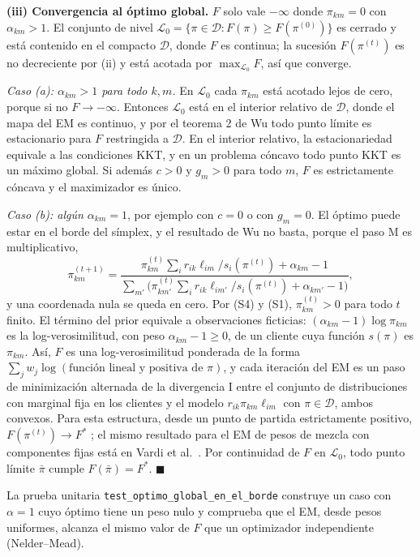 \documentclass[11pt,a4paper]{article}
\begin{document}
\textbf{(iii) Convergencia al óptimo global.} $F$ solo vale $-\infty$ donde $\pi_{km}=0$ con $\alpha_{km}>1$. El conjunto de nivel $\mathcal L_0=\{\pi\in\mathcal D:F(\pi)\ge F(\pi^{(0)})\}$ es cerrado y está contenido en el compacto $\mathcal D$, donde $F$ es continua; la sucesión $F(\pi^{(t)})$ es no decreciente por (ii) y está acotada por $\max_{\mathcal L_0}F$, así que converge.

\emph{Caso (a): $\alpha_{km}>1$ para todo $k,m$.} En $\mathcal L_0$ cada $\pi_{km}$ está acotado lejos de cero, porque si no $F\to-\infty$. Entonces $\mathcal L_0$ está en el interior relativo de $\mathcal D$, donde el mapa del EM es continuo, y por el teorema 2 de Wu \cite{wu1983} todo punto límite es estacionario para $F$ restringida a $\mathcal D$. En el interior relativo, la estacionariedad equivale a las condiciones KKT, y en un problema cóncavo todo punto KKT es un máximo global. Si además $c>0$ y $g_m>0$ para todo $m$, $F$ es estrictamente cóncava y el maximizador es único.

\emph{Caso (b): algún $\alpha_{km}=1$}, por ejemplo con $c=0$ o con $g_m=0$. El óptimo puede estar en el borde del símplex, y el resultado de Wu no basta, porque el paso M es multiplicativo,
\[
\pi^{(t+1)}_{km}=\frac{\pi^{(t)}_{km}\sum_i r_{ik}\ell_{im}/s_i(\pi^{(t)})+\alpha_{km}-1}{\sum_{m'}\big(\pi^{(t)}_{km'}\sum_i r_{ik}\ell_{im'}/s_i(\pi^{(t)})+\alpha_{km'}-1\big)},
\]
y una coordenada nula se queda en cero. Por (S4) y (S1), $\pi^{(t)}_{km}>0$ para todo $t$ finito. El término del prior equivale a observaciones ficticias: $(\alpha_{km}-1)\log\pi_{km}$ es la log-verosimilitud, con peso $\alpha_{km}-1\ge0$, de un cliente cuya función $s(\pi)$ es $\pi_{km}$. Así, $F$ es una log-verosimilitud ponderada de la forma $\sum_j w_j\log(\text{función lineal y positiva de }\pi)$, y cada iteración del EM es un paso de minimización alternada de la divergencia I entre el conjunto de distribuciones con marginal fija en los clientes y el modelo $r_{ik}\pi_{km}\ell_{im}$ con $\pi\in\mathcal D$, ambos convexos. Para esta estructura, desde un punto de partida estrictamente positivo, $F(\pi^{(t)})\to F^\ast$ \cite{csiszar1984}; el mismo resultado para el EM de pesos de mezcla con componentes fijas está en Vardi et al.\ \cite{vardi1985}. Por continuidad de $F$ en $\mathcal L_0$, todo punto límite $\bar\pi$ cumple $F(\bar\pi)=F^\ast$. $\blacksquare$

La prueba unitaria \texttt{test\_optimo\_global\_en\_el\_borde} construye un caso con $\alpha=1$ cuyo óptimo tiene un peso nulo y comprueba que el EM, desde pesos uniformes, alcanza el mismo valor de $F$ que un optimizador independiente (Nelder--Mead).
\end{document}

